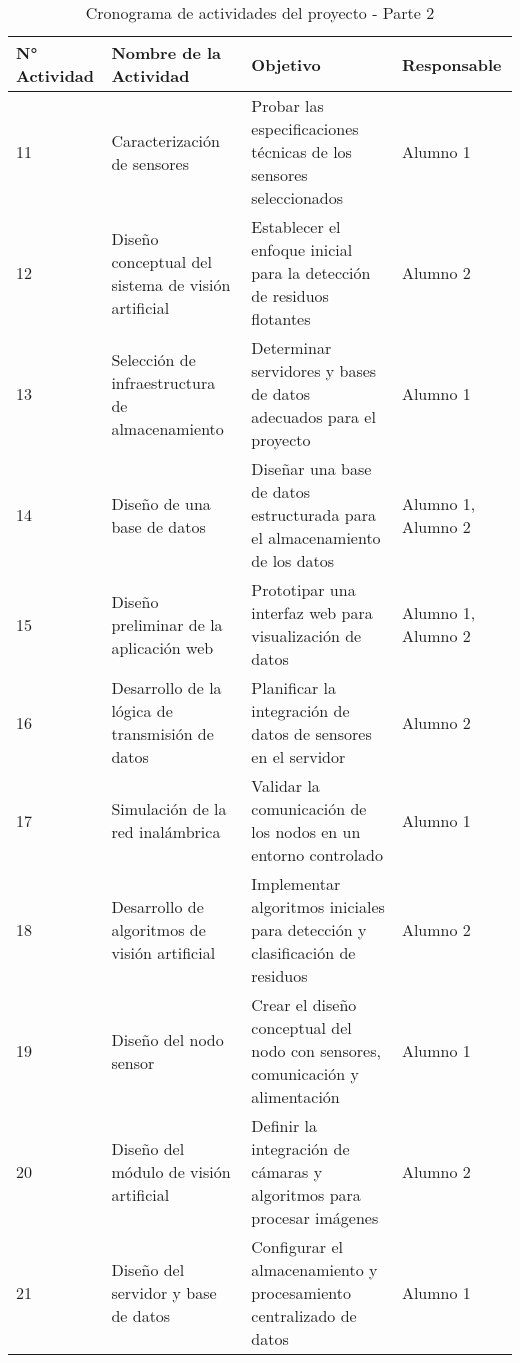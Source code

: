 \begin{table}[H]
    \centering
    \renewcommand{\arraystretch}{1.5}
    \begin{tabular}{ |p{1.5cm}|p{5cm}|p{5.5cm}|p{2.5cm}| }

        \hline
        \textbf{N° Actividad} & \textbf{Nombre de la Actividad} & \textbf{Objetivo} & \textbf{Responsable} \\
        \hline

       11 & Caracterización de sensores & Probar las especificaciones técnicas de los sensores seleccionados & Alumno 1 \\\hline
        12 & Diseño conceptual del sistema de visión artificial & Establecer el enfoque inicial para la detección de residuos flotantes & Alumno 2 \\\hline
        13 & Selección de infraestructura de almacenamiento & Determinar servidores y bases de datos adecuados para el proyecto & Alumno 1 \\\hline
        14 & Diseño de una base de datos  & Diseñar una base de datos estructurada para el almacenamiento de los datos & Alumno 1, Alumno 2\\\hline
        15 & Diseño preliminar de la aplicación web & Prototipar una interfaz web para visualización de datos & Alumno 1, Alumno 2 \\\hline
        16 & Desarrollo de la lógica de transmisión de datos & Planificar la integración de datos de sensores en el servidor & Alumno 2 \\\hline
        17 & Simulación de la red inalámbrica & Validar la comunicación de los nodos en un entorno controlado & Alumno 1 \\\hline
        18 & Desarrollo de algoritmos de visión artificial & Implementar algoritmos iniciales para detección y clasificación de residuos & Alumno 2 \\\hline
        19 & Diseño del nodo sensor & Crear el diseño conceptual del nodo con sensores, comunicación y alimentación & Alumno 1 \\\hline
        20 & Diseño del módulo de visión artificial & Definir la integración de cámaras y algoritmos para procesar imágenes & Alumno 2 \\\hline
        21 & Diseño del servidor y base de datos & Configurar el almacenamiento y procesamiento centralizado de datos & Alumno 1 \\\hline

    \end{tabular}
    \caption{Cronograma de actividades del proyecto - Parte 2}
    \label{tab:cronograma_proyecto_parte2}
\end{table}

